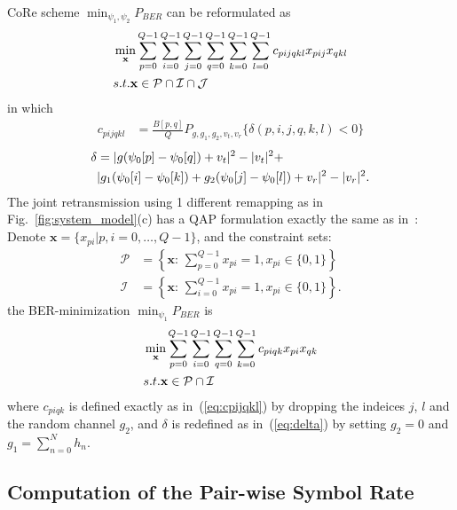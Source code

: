 \documentclass[conference]{IEEEtran}
\begin{document}
CoRe scheme $\min_{\psi_1, \psi_2}P_{BER}$ can be reformulated as
\begin{align}
    & \min_{\mathbf{x}}\sum_{p=0}^{Q-1}\sum_{i=0}^{Q-1}\sum_{j=0}^{Q-1}
    \sum_{q=0}^{Q-1}\sum_{k=0}^{Q-1}\sum_{l=0}^{Q-1}c_{pijqkl}x_{pij}x_{qkl}
    \label{eq:Q3AP}\\
    & \mbox{s.t. } \mathbf{x}\in \mathcal{P}\cap\mathcal{I}\cap\mathcal{J}
    \notag
\end{align}
in which
\begin{align}
    c_{pijqkl} & = \frac{B[p, q]}{Q}P_{g,g_1,g_2,v_t,v_r}\{\delta(p,i,j,q,k,l)
    < 0\}
    \label{eq:cpijqkl}
\end{align}
\begin{align}
    \delta & = |g(\psi_0[p] - \psi_0[q]) + v_t|^2 - |v_t|^2 +\notag
    \\
    &
    |g_1(\psi_0[i] - \psi_0[k])+g_2(\psi_0[j] - \psi_0[l])+v_r|^2 -
    |v_r|^2.\label{eq:delta}
\end{align}
The joint retransmission using 1 different remapping as in
Fig.~\ref{fig:system_model}(c) has a QAP formulation exactly the same as
in~\cite{}: Denote  $\mathbf{x} = \{x_{pi}|p,i=0,\ldots,Q-1\}$, and the
constraint sets:
\begin{subequations}
    \begin{align}
        \mathcal{P} & = \left\{\mathbf{x}:\,\sum_{p=0}^{Q-1}x_{pi} = 1,
        x_{pi}\in\{0, 1\}\right\}
        \\
        \mathcal{I} & = \left\{\mathbf{x}:\,\sum_{i=0}^{Q-1}x_{pi} = 1,
        x_{pi}\in\{0, 1\}\right\}.
    \end{align}
\end{subequations}
the BER-minimization $\min_{\psi_1}P_{BER}$ is
\begin{align}
    & \min_{\mathbf{x}}\sum_{p=0}^{Q-1}\sum_{i=0}^{Q-1}
    \sum_{q=0}^{Q-1}\sum_{k=0}^{Q-1}c_{piqk}x_{pi}x_{qk}
    \label{eq:QAP}\\
    & \mbox{s.t. } \mathbf{x}\in \mathcal{P}\cap\mathcal{I}
    \notag
\end{align}
where $c_{piqk}$ is defined exactly as in~(\ref{eq:cpijqkl}) by dropping the
indeices $j$, $l$ and the random channel $g_2$, and $\delta$ is redefined as
in~(\ref{eq:delta}) by setting $g_2 = 0$ and $g_1 = \sum_{n=0}^Nh_n$.

\subsection{Computation of the Pair-wise Symbol Rate}
\end{document}
